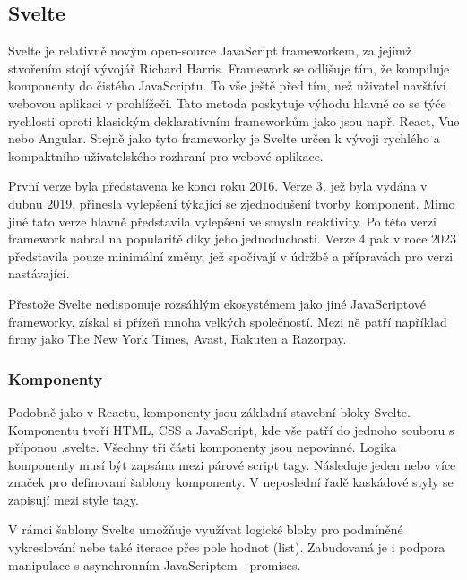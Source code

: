 \subsection{Svelte}

Svelte je relativně novým open-source JavaScript frameworkem, za jejímž stvořením stojí vývojář Richard Harris. 
Framework se odlišuje tím, že kompiluje komponenty do čistého JavaScriptu. To vše ještě před tím, než uživatel navštíví webovou aplikaci v prohlížeči. 
Tato metoda poskytuje výhodu hlavně co se týče rychlosti oproti klasickým deklarativním frameworkům jako jsou např. React, Vue nebo Angular. 
Stejně jako tyto frameworky je Svelte určen k vývoji rychlého a kompaktního uživatelského rozhraní pro webové aplikace.

První verze byla představena ke konci roku 2016. Verze 3, jež byla vydána v dubnu 2019, přinesla vylepšení týkající se zjednodušení tvorby komponent. 
Mimo jiné tato verze hlavně představila vylepšení ve smyslu reaktivity. Po této verzi framework nabral na popularitě díky jeho jednoduchosti.
Verze 4 pak v roce 2023 představila pouze minimální změny, jež spočívají v údržbě a přípravách pro verzi nastávající.

Přestože Svelte nedisponuje rozsáhlým ekosystémem jako jiné JavaScriptové frameworky, získal si přízeň mnoha velkých společností. 
Mezi ně patří například firmy jako The New York Times, Avast, Rakuten a Razorpay.\cite{sveltemdn,svelte,sveltedevinterface}


\subsubsection{Komponenty}

Podobně jako v Reactu, komponenty jsou základní stavební bloky Svelte. Komponentu tvoří HTML, CSS a JavaScript, kde vše patří do jednoho souboru s příponou .svelte. 
Všechny tři části komponenty jsou nepovinné. Logika komponenty musí být zapsána mezi párové script tagy. Následuje jeden nebo více značek pro definovaní šablony komponenty. 
V neposlední řadě kaskádové styly se zapisují mezi style tagy.

V rámci šablony Svelte umožňuje využívat logické bloky pro podmíněné vykreslování nebe také iterace přes pole hodnot (list). 
Zabudovaná je i podpora manipulace s asynchronním JavaScriptem - promises.\cite{svelte}

